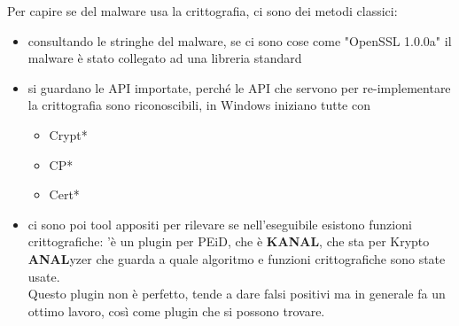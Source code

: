 \documentclass[12pt, oneside]{extbook}
\begin{document}
Per capire se del malware usa la crittografia, ci sono dei metodi classici:
\begin{itemize}
	\item consultando le stringhe del malware, se ci sono cose come "OpenSSL 1.0.0a" il malware è stato collegato ad una libreria standard
	\item si guardano le API importate, perché le API che servono per re-implementare la crittografia sono riconoscibili, in Windows iniziano tutte con
	\begin{itemize}
		\item Crypt*
		\item CP*
		\item Cert*
	\end{itemize}
	\item ci sono poi tool appositi per rilevare se nell'eseguibile esistono funzioni crittografiche: 'è un plugin per PEiD, che è \textbf{\textsf{KANAL}}, che sta per Krypto \textbf{\textsf{ANAL}}yzer che guarda a quale algoritmo e funzioni crittografiche sono state usate.\\Questo plugin non è perfetto, tende a dare falsi positivi ma in generale fa un ottimo lavoro, così come plugin che si possono trovare.
\end{itemize}
\end{document}
